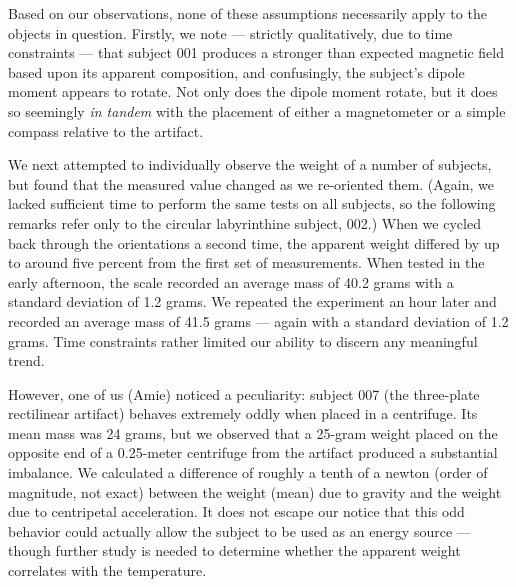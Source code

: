 \documentclass[10pt]{article}
\theoremstyle{definition}
\begin{document}
Based on our observations, none of these assumptions necessarily apply to the objects in question.
Firstly, we note --- strictly qualitatively, due to time constraints --- that subject 001 produces a stronger than expected magnetic field based upon its apparent composition, and confusingly, the subject's dipole moment appears to rotate.
Not only does the dipole moment rotate, but it does so seemingly \textit{in tandem} with the placement of either a magnetometer or a simple compass relative to the artifact.

We next attempted to individually observe the weight of a number of subjects, but found that the measured value changed as we re-oriented them.
(Again, we lacked sufficient time to perform the same tests on all subjects, so the following remarks refer only to the circular labyrinthine subject, 002.)
When we cycled back through the orientations a second time, the apparent weight differed by up to around five percent from the first set of measurements.
When tested in the early afternoon, the scale recorded an average mass of 40.2 grams with a standard deviation of 1.2 grams.
We repeated the experiment an hour later and recorded an average mass of 41.5 grams --- again with a standard deviation of 1.2 grams.
Time constraints rather limited our ability to discern any meaningful trend.

However, one of us (Amie) noticed a peculiarity: subject 007 (the three-plate rectilinear artifact) behaves extremely oddly when placed in a centrifuge.
Its mean mass was 24 grams, but we observed that a 25-gram weight placed on the opposite end of a 0.25-meter centrifuge from the artifact produced a substantial imbalance.
We calculated a difference of roughly a tenth of a newton (order of magnitude, not exact) between the weight (mean) due to gravity and the weight due to centripetal acceleration.
It does not escape our notice that this odd behavior could actually allow the subject to be used as an energy source --- though further study is needed to determine whether the apparent weight correlates with the temperature.
\end{document}
